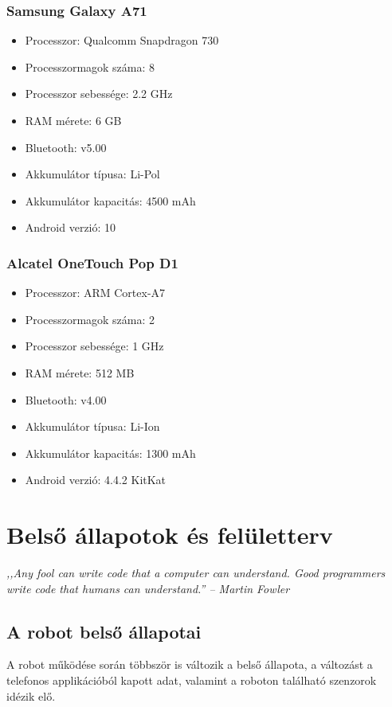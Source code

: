 \documentclass[]{thesis-ekf}
\theoremstyle{definition}
\begin{document}
\subsection{Samsung Galaxy A71}
\begin{itemize}
	\item Processzor: Qualcomm Snapdragon 730
	\item Processzormagok száma: 8
	\item Processzor sebessége: 2.2 GHz
	\item RAM mérete: 6 GB
	\item Bluetooth: v5.00
	\item Akkumulátor típusa: Li-Pol
	\item Akkumulátor kapacitás: 4500 mAh
	\item Android verzió: 10
\end{itemize}
\subsection{Alcatel OneTouch Pop D1}
\begin{itemize}
	\item Processzor: ARM Cortex-A7
	\item Processzormagok száma: 2
	\item Processzor sebessége: 1 GHz
	\item RAM mérete: 512 MB
	\item Bluetooth: v4.00
	\item Akkumulátor típusa: Li-Ion
	\item Akkumulátor kapacitás: 1300 mAh
	\item Android verzió: 4.4.2 KitKat
\end{itemize}
\chapter{Belső állapotok és felületterv}
\emph{,,Any fool can write code that a computer can understand. Good programmers write code that humans can understand.'' -- Martin Fowler}
\section{A robot belső állapotai}
A robot működése során többször is változik a belső állapota, a változást a telefonos applikációból kapott adat, valamint a roboton található szenzorok idézik elő.
\end{document}
